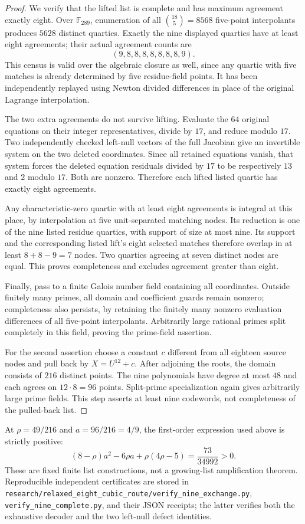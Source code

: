 \begin{proof}
We verify that the lifted list is complete and has maximum agreement exactly eight. Over $\mathbb F_{289}$, enumeration of all $\binom{18}{5}=8568$ five-point interpolants produces $5628$ distinct quartics. Exactly the nine displayed quartics have at least eight agreements; their actual agreement counts are
\[
(9,8,8,8,8,8,8,8,9).
\]
This census is valid over the algebraic closure as well, since any quartic with five matches is already determined by five residue-field points. It has been independently replayed using Newton divided differences in place of the original Lagrange interpolation.

The two extra agreements do not survive lifting. Evaluate the $64$ original equations on their integer representatives, divide by $17$, and reduce modulo $17$. Two independently checked left-null vectors of the full Jacobian give an invertible system on the two deleted coordinates. Since all retained equations vanish, that system forces the deleted equation residuals divided by $17$ to be respectively $13$ and $2$ modulo $17$. Both are nonzero. Therefore each lifted listed quartic has exactly eight agreements.

Any characteristic-zero quartic with at least eight agreements is integral at this place, by interpolation at five unit-separated matching nodes. Its reduction is one of the nine listed residue quartics, with support of size at most nine. Its support and the corresponding listed lift's eight selected matches therefore overlap in at least $8+8-9=7$ nodes. Two quartics agreeing at seven distinct nodes are equal. This proves completeness and excludes agreement greater than eight.

Finally, pass to a finite Galois number field containing all coordinates. Outside finitely many primes, all domain and coefficient guards remain nonzero; completeness also persists, by retaining the finitely many nonzero evaluation differences of all five-point interpolants. Arbitrarily large rational primes split completely in this field, proving the prime-field assertion.

For the second assertion choose a constant $c$ different from all eighteen source nodes and pull back by $X=U^{12}+c$. After adjoining the roots, the domain consists of $216$ distinct points. The nine polynomials have degree at most $48$ and each agrees on $12\cdot8=96$ points. Split-prime specialization again gives arbitrarily large prime fields. This step asserts at least nine codewords, not completeness of the pulled-back list.
\end{proof}

At $\rho=49/216$ and $a=96/216=4/9$, the first-order expression used above is strictly positive:
\[
 (8-\rho)a^2-6\rho a+\rho(4\rho-5)=\frac{73}{34992}>0.
\]
These are fixed finite list constructions, not a growing-list amplification theorem. Reproducible independent certificates are stored in
\nolinkurl{research/relaxed_eight_cubic_route/verify_nine_exchange.py},
\texttt{verify\_nine\_complete.py}, and their JSON receipts; the latter verifies both the exhaustive decoder and the two left-null defect identities.
